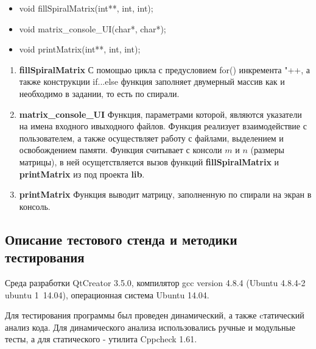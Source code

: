 \documentclass[12pt,a4paper]{report}
\begin{document}
\begin{itemize}
\item void fillSpiralMatrix(int**, int, int);
\item void matrix\_console\_UI(char*, char*);
\item void printMatrix(int**, int, int);
\end{itemize}

\begin{enumerate}

		\item \textbf{fillSpiralMatrix}
	С помощью цикла с предусловием for() инкремента "++, а также конструкции if...else функция заполняет двумерный массив как и необходимо в задании, то есть по спирали. 	 
	
		\item \textbf{matrix\_console\_UI}	
	Функция, параметрами которой, являются указатели на имена входного ивыходного файлов. Функция реализует взаимодействие с пользователем, а также осуществляет работу с файлами, выделением и освобождением памяти. Функция считывает с консоли $m$ и $n$ (размеры матрицы), в ней осущетствляется вызов функций \textbf{fillSpiralMatrix} и \textbf{printMatrix} из под проекта \textbf{lib}.
	
		\item \textbf{printMatrix}
	Функция выводит матрицу, заполненную по спирали на экран в консоль.

\end{enumerate}

\subsection{Описание тестового стенда и методики тестирования}
\hspace{\parindent}
Среда разработки QtCreator 3.5.0, компилятор gcc version 4.8.4 (Ubuntu 4.8.4-2 ubuntu 1~14.04), операционная система Ubuntu 14.04. 

Для тестирования программы был проведен динамический, а также cтатический анализ кода. Для динамического анализа использовались ручные и модульные тесты, а для статического - утилита Cppcheck 1.61.
\end{document}
